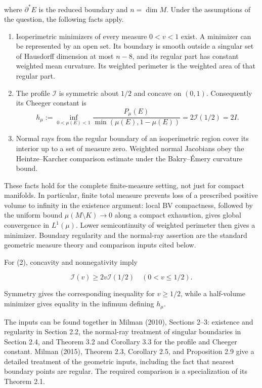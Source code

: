 \documentclass[11pt,a4paper]{article}
\providecommand{\tightlist}{\setlength{\itemsep}{0pt}\setlength{\parskip}{0pt}}
\begin{document}
where \(\partial^*E\) is the reduced boundary and \(n=\dim M\). Under
the assumptions of the question, the following facts apply.

\begin{enumerate}
\def\labelenumi{\arabic{enumi}.}
\tightlist
\item
  Isoperimetric minimizers of every measure \(0<v<1\) exist. A minimizer
  can be represented by an open set. Its boundary is smooth outside a
  singular set of Hausdorff dimension at most \(n-8\), and its regular
  part has constant weighted mean curvature. Its weighted perimeter is
  the weighted area of that regular part.
\item
  The profile \(\mathcal I\) is symmetric about \(1/2\) and concave on
  \((0,1)\). Consequently its Cheeger constant is \[
  h_\mu:=\inf_{0<\mu(E)<1}
  \frac{P_\mu(E)}{\min(\mu(E),1-\mu(E))}
  =2\mathcal I(1/2)=2I.
  \tag{2}
  \]
\item
  Normal rays from the regular boundary of an isoperimetric region cover
  its interior up to a set of measure zero. Weighted normal Jacobians
  obey the Heintze--Karcher comparison estimate under the Bakry--Émery
  curvature bound.
\end{enumerate}

These facts hold for the complete finite-measure setting, not just for
compact manifolds. In particular, finite total measure prevents loss of
a prescribed positive volume to infinity in the existence argument:
local BV compactness, followed by the uniform bound
\(\mu(M\setminus K)\to0\) along a compact exhaustion, gives global
convergence in \(L^1(\mu)\). Lower semicontinuity of weighted perimeter
then gives a minimizer. Boundary regularity and the normal-ray assertion
are the standard geometric measure theory and comparison inputs cited
below.

For (2), concavity and nonnegativity imply

\[
\mathcal I(v)\geq2v\mathcal I(1/2)
\quad(0<v\leq1/2).
\]

Symmetry gives the corresponding inequality for \(v\geq1/2\), while a
half-volume minimizer gives equality in the infimum defining \(h_\mu\).

The inputs can be found together in Milman (2010), Sections 2--3:
existence and regularity in Section 2.2, the normal-ray treatment of
singular boundaries in Section 2.4, and Theorem 3.2 and Corollary 3.3
for the profile and Cheeger constant. Milman (2015), Theorem 2.3,
Corollary 2.5, and Proposition 2.9 give a detailed treatment of the
geometric inputs, including the fact that nearest boundary points are
regular. The required comparison is a specialization of its Theorem 2.1.
\end{document}
